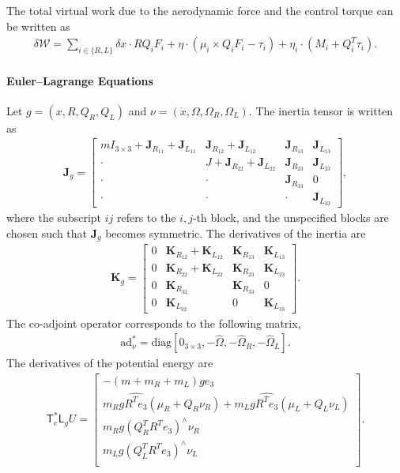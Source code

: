 \documentclass[10pt,draft]{article}
\newcommand{\T}{\ensuremath{\mathsf{T}}}
\renewcommand{\L}{\ensuremath{\mathsf{L}}}
\begin{document}
The total virtual work due to the aerodynamic force and the control torque can be written as
\begin{align}
    \delta\mathcal{W} = \sum_{i\in\{R,L\}} \delta x \cdot R Q_i F_i + \eta\cdot (\mu_i\times Q_i F_i -\tau_i) + \eta_i \cdot ( M_i+ Q_i^T \tau_i).
\end{align}

\paragraph{Euler--Lagrange Equations}

Let $g=(x, R, Q_R, Q_L)$ and $\nu=(\dot x, \Omega, \Omega_R, \Omega_L)$.
The inertia tensor is written as
\begin{align}
    \mathbf{J}_g = \begin{bmatrix}
        m I_{3\times 3} + \mathbf{J}_{R_{11}} + \mathbf{J}_{L_{11}} 
        & \mathbf{J}_{R_{12 }} + \mathbf{J}_{L_{12}}
        & \mathbf{J}_{R_{13 }}
        & \mathbf{J}_{L_{13}} \\
        \cdot & J + \mathbf{J}_{R_{22}} +\mathbf{J}_{L_{22}}
        & \mathbf{J}_{R_{23}} 
        & \mathbf{J}_{L_{23}} \\
        \cdot & \cdot &  \mathbf{J}_{R_{33}}
              & 0 \\
        \cdot & \cdot & \cdot 
              & \mathbf{J}_{L_{33}}
    \end{bmatrix},
\end{align}
where the subscript $ij$ refers to the $i,j$-th block, and the unspecified blocks are chosen such that $\mathbf{J}_g$ becomes symmetric.
The derivatives of the inertia are
\begin{align}
    \mathbf{K}_g = \begin{bmatrix}
        0 & \mathbf{K}_{R_{12}} + \mathbf{K}_{L_{12}} & \mathbf{K}_{R_{13}} & \mathbf{K}_{L_{13}} \\
        0 & \mathbf{K}_{R_{22}} + \mathbf{K}_{L_{22}}& \mathbf{K}_{R_{23}} & \mathbf{K}_{L_{23}} \\
        0 & \mathbf{K}_{R_{32}} & \mathbf{K}_{R_{33}} & 0 \\
        0 & \mathbf{K}_{L_{32}} & 0 & \mathbf{K}_{L_{33}}
    \end{bmatrix}.
\end{align}
The co-adjoint operator corresponds to the following matrix,
\begin{align}
    \mathrm{ad}^*_\nu = \mathrm{diag}[0_{3\times 3}, -\hat\Omega, -\hat\Omega_R, -\hat\Omega_L].
\end{align}
The derivatives of the potential energy are
\begin{align}
    \T^*_e\L_g U = \begin{bmatrix}
    - (m+m_R+m_L)g e_3\\
    m_Rg \widehat{R^T e_3} (\mu_R + Q_R \nu_R) + m_L g \widehat{R^T e_3} (\mu_L + Q_L \nu_L)\\
    m_R g  (Q_R^T R^T e_3)^\wedge \nu_R\\
    m_L g  (Q_L^T R^T e_3)^\wedge \nu_L\\
\end{bmatrix}.
\end{align}
\end{document}
